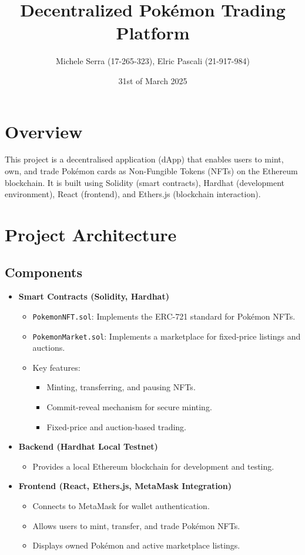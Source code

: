 \documentclass{article}
\title{Decentralized Pokémon Trading Platform}
\author{Michele Serra (17-265-323), Elric Pascali (21-917-984)}
\date{31st of March 2025}
\begin{document}
\maketitle

\section{Overview}
This project is a decentralised application (dApp) that enables users to mint, own, and trade Pokémon cards as Non-Fungible Tokens (NFTs) on the Ethereum blockchain. It is built using Solidity (smart contracts), Hardhat (development environment), React (frontend), and Ethers.js (blockchain interaction).

\section{Project Architecture}
\subsection{Components}
\begin{itemize}
    \item \textbf{Smart Contracts (Solidity, Hardhat)}
    \begin{itemize}
        \item \texttt{PokemonNFT.sol}: Implements the ERC-721 standard for Pokémon NFTs.
        \item \texttt{PokemonMarket.sol}: Implements a marketplace for fixed-price listings and auctions.
        \item Key features:
        \begin{itemize}
            \item Minting, transferring, and pausing NFTs.
            \item Commit-reveal mechanism for secure minting.
            \item Fixed-price and auction-based trading.
        \end{itemize}
    \end{itemize}
    
    \item \textbf{Backend (Hardhat Local Testnet)}
    \begin{itemize}
        \item Provides a local Ethereum blockchain for development and testing.
    \end{itemize}
    
    \item \textbf{Frontend (React, Ethers.js, MetaMask Integration)}
    \begin{itemize}
        \item Connects to MetaMask for wallet authentication.
        \item Allows users to mint, transfer, and trade Pokémon NFTs.
        \item Displays owned Pokémon and active marketplace listings.
    \end{itemize}
\end{itemize}
\end{document}
